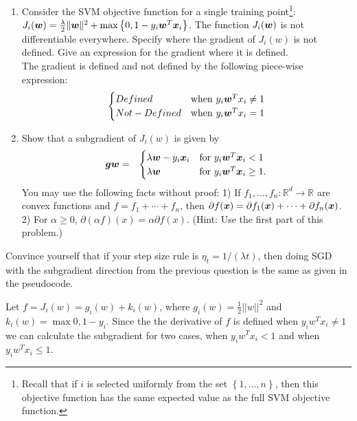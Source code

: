 \documentclass{article}
\theoremstyle{plain}
\theoremstyle{definition}
\begin{document}
\begin{enumerate}
  \setcounter{enumi}{\value{saveenum}}
\item Consider the SVM objective function for a single training point\footnote{Recall that if $i$ is selected uniformly from the set $\left\{ 1,\ldots,n\right\} $,
then this objective function has the same expected value
as the full SVM objective function.}: $J_{i}(\boldsymbol{w})=\frac{\lambda}{2}\|\boldsymbol{w}\|^{2}+\max\left\{ 0,1-y_{i}\boldsymbol{w}^{T}\boldsymbol{x}_{i}\right\} $.
The function $J_{i}(\boldsymbol{w})$ is not differentiable everywhere. Specify where the gradient of $J_{i}(w)$ is not defined. Give an expression for the gradient where it is defined.\\
\subitem
The gradient is defined and not defined by the following piece-wise expression:
$$
\begin{cases}
Defined & \text{when } y_{i}\boldsymbol{w}^{T}x_i \neq 1 \\
Not-Defined & \text{when } y_{i}\boldsymbol{w}^{T}x_i = 1
\end{cases}
$$
\item Show that a subgradient of $J_{i}(w)$ is given by 
\begin{eqnarray*}
\boldsymbol{g}{\boldsymbol{w}} & = & \begin{cases}
\lambda \boldsymbol{w}-y_{i}\boldsymbol{x}_{i} & \mbox{for }y_{i}\boldsymbol{w}^{T}\boldsymbol{x}_{i}<1\\
\lambda \boldsymbol{w} & \mbox{for }y_{i}\boldsymbol{w}^{T}\boldsymbol{x}_{i}\ge1.
\end{cases}
\end{eqnarray*}
You may use the following facts without proof: 1) If $f_{1},\ldots,f_{n}:\mathbb{R}^{d}\to\mathbb{R}$
are convex functions and $f=f_{1}+\cdots+f_{n}$, then $\partial f(\boldsymbol{x})=\partial f_{1}(\boldsymbol{x})+\cdots+\partial f_{n}(\boldsymbol{x})$.
2) For $\alpha\ge0$, $\partial\left(\alpha f\right)(x)=\alpha\partial f(x)$.
(Hint: Use the 
first part of this problem.)
\setcounter{saveenum}{\value{enumi}}
\end{enumerate}

Convince yourself that if your step size rule is $\eta_{t}=1/\left(\lambda t\right)$,
then doing SGD with the subgradient direction from the previous question
is the same as given in the pseudocode. \\

\subitem

Let  $f=J_i(w)= g_i(w) + k_i(w)$, where $g_i(w) = \frac{1}{2}||w||^2$ and $k_i(w) = \max{ 0,1-y_{i}}$. Since the the derivative of $f$ is defined when $y_iw^Tx_i \neq 1$ we can calculate the subgradient for two cases, when $y_iw^Tx_i < 1$ and when $y_iw^Tx_i\leq1$.
\end{document}
